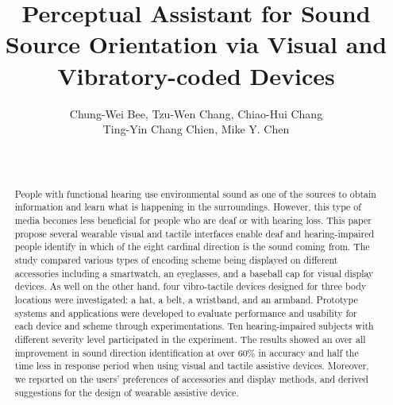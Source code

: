\documentclass{sigchi}
\begin{document}
\title{Perceptual Assistant for Sound Source Orientation via Visual and Vibratory-coded Devices}

\author{ 
	\alignauthor Chung-Wei Bee, Tzu-Wen Chang, Chiao-Hui Chang
	\\ Ting-Yin Chang Chien, Mike Y. Chen\\
	\\
	\\
}


\maketitle

\begin{abstract}
People with functional hearing use environmental sound as one of the sources to obtain information and learn what is happening in the surroundings. However, this type of media becomes less beneficial for people who are deaf or with hearing loss. This paper propose several wearable visual and tactile interfaces enable deaf and hearing-impaired people identify in which of the eight cardinal direction is the sound coming from. The study compared various types of encoding scheme being displayed on different accessories including a smartwatch, an eyeglasses, and a baseball cap for visual display devices. As well on the other hand, four vibro-tactile devices designed for three body locations were investigated: a hat, a belt, a wristband, and an armband. Prototype systems and applications were developed to evaluate performance and usability for each device and scheme through experimentations. Ten hearing-impaired subjects with different severity level participated in the experiment. The results showed an over all improvement in sound direction identification at over 60\% in accuracy and half the time less in response period when using visual and tactile assistive devices. Moreover, we reported on the users' preferences of accessories and display methods, and derived suggestions for the design of wearable assistive device.
\end{abstract}

\end{document}
